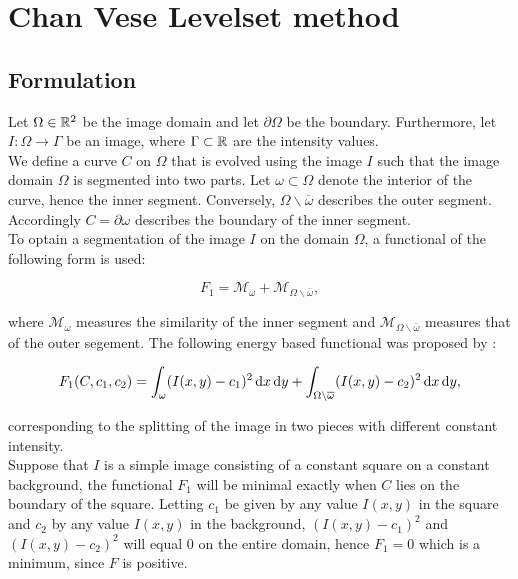 
\chapter{Chan Vese Levelset method}\label{chapter:CVL}
\section{Formulation}
Let $\Omega\in \mathbb R^2$ be the image domain and let $\partial\Omega$ be the boundary. Furthermore, let $I:\Omega\to \Gamma$ be an image, where $\Gamma\subset\mathbb R$ are the intensity values.\\
We define a curve $C$ on $\Omega$ that is evolved using the image $I$ such that the image domain $\Omega$ is segmented into two parts. Let $\omega\subset\Omega$ denote the interior of the curve, hence the inner segment. Conversely, $\Omega\backslash\overline{\omega}$ describes the outer segment. Accordingly $C=\partial\omega$ describes the boundary of the inner segment.\\
To optain a segmentation of the image $I$ on the domain $\Omega$, a functional of the following form is used:

\begin{equation}
  F_1 = \mathcal{M}_{\omega} + \mathcal{M}_{\Omega\backslash\overline{\omega}},
\end{equation}

where $\mathcal{M}_{\omega}$ measures the similarity of the inner segment and $\mathcal{M}_{\Omega\backslash\overline{\omega}}$ measures that of the outer segement. The following energy based functional was proposed by \cite{chan.01}:

\begin{equation}
  F_1(C,c_1,c_2) = \int_{\omega} (I(x,y)-c_1)^2 \df x \df y + \int_{\Omega\backslash\overline{\omega}} (I(x,y)-c_2)^2 \df x \df y,\label{F0}
\end{equation} 

corresponding to the splitting of the image in two pieces with different constant intensity.\\
Suppose that $I$ is a simple image consisting of a constant square on a constant background, the functional $F_1$ will be minimal exactly when $C$ lies on the boundary of the square. Letting $c_1$ be given by any value  $I(x,y)$ in the square and $c_2$ by any value $I(x,y)$ in the background, $(I(x,y)-c_1)^2$ and $(I(x,y)-c_2)^2$ will equal 0 on the entire domain, hence $F_1=0$ which is a minimum, since $F$ is positive.\\

